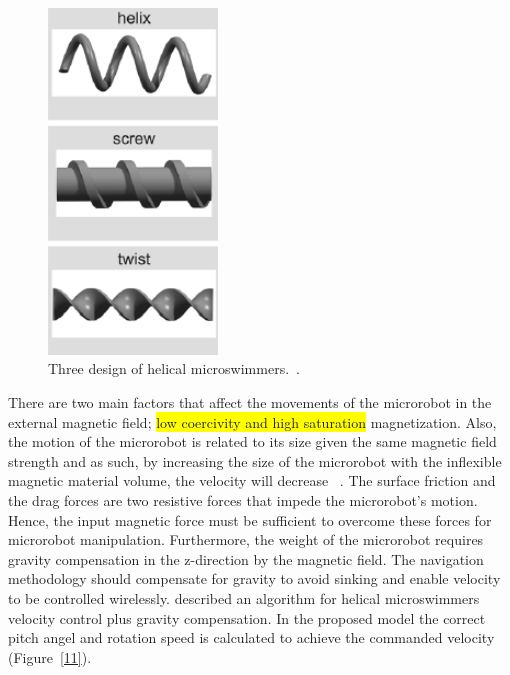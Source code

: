 \documentclass[12pt,a4paper,titlepage]{report}
\newcommand{\hilight}[1]{\colorbox{yellow}{#1}}
\begin{document}
\begin{figure}
  \begin{center}
    \includegraphics[width=0.4\textwidth]{HelixShapes}
  \caption{Three design of helical microswimmers.~\citep{peyer2013magnetic}.}
  \label{HelixShapes}
  \end{center}
\end{figure}



There are two main factors that affect the movements of the microrobot in the external magnetic
 field; \hilight{low coercivity and high saturation} magnetization. Also, the motion of the microrobot is related to 
its size given the same magnetic field strength and as such, by increasing the size of the microrobot with the inflexible magnetic material
 volume, the velocity will decrease ~\citep{kim2013fabrication}. 
The surface friction and the drag forces are two resistive forces that impede the microrobot\rq{}s 
motion. Hence, the input magnetic force must be sufficient to overcome these forces for microrobot 
manipulation. Furthermore, the weight of the microrobot requires gravity compensation in the z-direction by 
the magnetic field. The navigation methodology should compensate for gravity to avoid sinking and enable velocity to be 
controlled wirelessly. \citeauthor{mahoney2011velocity} described an algorithm for helical microswimmers velocity 
control plus gravity compensation. In the proposed model the correct pitch angel and 
rotation speed is calculated to achieve the commanded velocity (Figure~\ref{11}).
\end{document}
